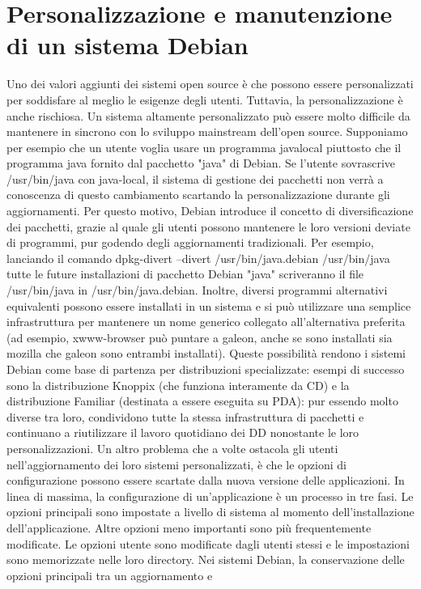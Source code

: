 \documentclass[a4paper,12pt,titlepage,oneside]{book}
\begin{document}
\section{Personalizzazione e manutenzione di un sistema Debian}
    Uno dei valori aggiunti dei sistemi open source è che possono essere personalizzati per soddisfare al meglio le esigenze degli utenti. Tuttavia, la personalizzazione è anche rischiosa. Un sistema altamente
    personalizzato può essere molto difficile da mantenere in sincrono con lo sviluppo mainstream dell'open source. Supponiamo
    per esempio che un utente voglia usare un programma javalocal piuttosto che il programma java fornito dal pacchetto "java" di Debian. Se l'utente sovrascrive /usr/bin/java con java-local, 
    il sistema di gestione dei pacchetti non verrà a conoscenza di questo cambiamento scartando la personalizzazione durante gli aggiornamenti. Per questo motivo, Debian introduce il concetto di diversificazione dei pacchetti, grazie al quale gli utenti possono
    mantenere le loro versioni deviate di programmi, pur godendo degli aggiornamenti tradizionali. Per esempio, lanciando il comando dpkg-divert --divert /usr/bin/java.debian /usr/bin/java tutte le future installazioni 
    di pacchetto Debian "java" scriveranno il file /usr/bin/java in /usr/bin/java.debian. Inoltre, diversi programmi alternativi equivalenti possono essere installati in un sistema e si può utilizzare una semplice infrastruttura per mantenere un
    nome generico collegato all'alternativa preferita (ad esempio, xwww-browser può puntare a galeon, anche se sono installati sia mozilla che galeon sono entrambi installati). Queste possibilità rendono i sistemi 
    Debian come base di partenza per distribuzioni specializzate: esempi di successo sono la distribuzione Knoppix (che funziona interamente da CD) e la distribuzione Familiar (destinata a essere eseguita su PDA): pur essendo molto diverse tra loro, 
    condividono tutte la stessa infrastruttura di pacchetti e continuano a riutilizzare il lavoro quotidiano dei DD nonostante le loro personalizzazioni.
    Un altro problema che a volte ostacola gli utenti nell'aggiornamento dei loro sistemi personalizzati, è che le opzioni di configurazione possono essere scartate dalla nuova versione delle applicazioni.
    In linea di massima, la configurazione di un'applicazione è un processo in tre fasi. Le opzioni principali sono impostate a livello di sistema al momento dell'installazione dell'applicazione.
    Altre opzioni meno importanti sono più frequentemente modificate. Le opzioni utente sono modificate dagli utenti stessi e le impostazioni sono memorizzate nelle loro directory. Nei sistemi Debian, la conservazione delle opzioni principali tra un aggiornamento e 
\end{document}
